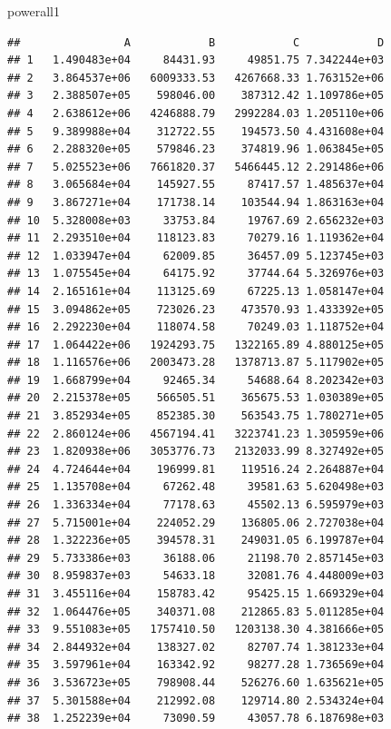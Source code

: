 \documentclass[
]{article}
\newenvironment{Shaded}{\begin{snugshade}}{\end{snugshade}}
\newcommand{\NormalTok}[1]{#1}
\begin{document}
\begin{Shaded}
\begin{Highlighting}[]
\NormalTok{powerall1}
\end{Highlighting}
\end{Shaded}

\begin{verbatim}
##                A            B            C            D
## 1   1.490483e+04     84431.93     49851.75 7.342244e+03
## 2   3.864537e+06   6009333.53   4267668.33 1.763152e+06
## 3   2.388507e+05    598046.00    387312.42 1.109786e+05
## 4   2.638612e+06   4246888.79   2992284.03 1.205110e+06
## 5   9.389988e+04    312722.55    194573.50 4.431608e+04
## 6   2.288320e+05    579846.23    374819.96 1.063845e+05
## 7   5.025523e+06   7661820.37   5466445.12 2.291486e+06
## 8   3.065684e+04    145927.55     87417.57 1.485637e+04
## 9   3.867271e+04    171738.14    103544.94 1.863163e+04
## 10  5.328008e+03     33753.84     19767.69 2.656232e+03
## 11  2.293510e+04    118123.83     70279.16 1.119362e+04
## 12  1.033947e+04     62009.85     36457.09 5.123745e+03
## 13  1.075545e+04     64175.92     37744.64 5.326976e+03
## 14  2.165161e+04    113125.69     67225.13 1.058147e+04
## 15  3.094862e+05    723026.23    473570.93 1.433392e+05
## 16  2.292230e+04    118074.58     70249.03 1.118752e+04
## 17  1.064422e+06   1924293.75   1322165.89 4.880125e+05
## 18  1.116576e+06   2003473.28   1378713.87 5.117902e+05
## 19  1.668799e+04     92465.34     54688.64 8.202342e+03
## 20  2.215378e+05    566505.51    365675.53 1.030389e+05
## 21  3.852934e+05    852385.30    563543.75 1.780271e+05
## 22  2.860124e+06   4567194.41   3223741.23 1.305959e+06
## 23  1.820938e+06   3053776.73   2132033.99 8.327492e+05
## 24  4.724644e+04    196999.81    119516.24 2.264887e+04
## 25  1.135708e+04     67262.48     39581.63 5.620498e+03
## 26  1.336334e+04     77178.63     45502.13 6.595979e+03
## 27  5.715001e+04    224052.29    136805.06 2.727038e+04
## 28  1.322236e+05    394578.31    249031.05 6.199787e+04
## 29  5.733386e+03     36188.06     21198.70 2.857145e+03
## 30  8.959837e+03     54633.18     32081.76 4.448009e+03
## 31  3.455116e+04    158783.42     95425.15 1.669329e+04
## 32  1.064476e+05    340371.08    212865.83 5.011285e+04
## 33  9.551083e+05   1757410.50   1203138.30 4.381666e+05
## 34  2.844932e+04    138327.02     82707.74 1.381233e+04
## 35  3.597961e+04    163342.92     98277.28 1.736569e+04
## 36  3.536723e+05    798908.44    526276.60 1.635621e+05
## 37  5.301588e+04    212992.08    129714.80 2.534324e+04
## 38  1.252239e+04     73090.59     43057.78 6.187698e+03

\end{verbatim}
\end{document}
